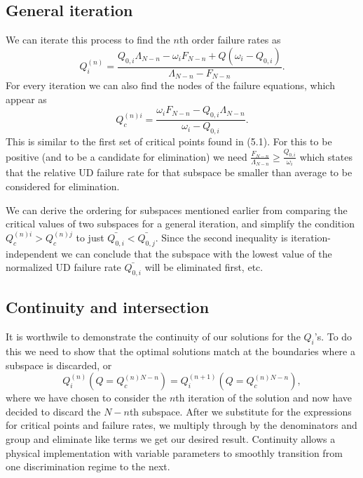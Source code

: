 \documentclass[12pt,oneside,english,reqno]{amsbook}
\numberwithin{section}{chapter}
\numberwithin{equation}{section}
\numberwithin{figure}{section}
\begin{document}
\subsection{General iteration}
We can iterate this process to find the $n$th order failure rates as
\begin{equation}  Q^{(n)}_i = \frac{ Q_{0,i}\Lambda_{N-n}  -  \omega_{i} F_{N-n} + Q( \omega_i - Q_{0,i} ) }{\Lambda_{N-n} - F_{N-n}}.\end{equation}
For every iteration we can also find the nodes of the failure equations, which appear as
\begin{equation}Q^{(n)i}_c = \frac{ \omega_{i} F_{N-n} -  Q_{0,i}\Lambda_{N-n}}{\omega_i - Q_{0,i}}.\end{equation}
This is similar to the first set of critical points found in (5.1). For this to be positive (and to be a candidate for elimination) we need $\frac{ F_{N-n}}{\Lambda_{N-n}} \geq\frac{ Q_{0,i}}{\omega_i}$ which states that the relative UD failure rate for that subspace be smaller than average to be considered for elimination. 

We can derive the ordering for subspaces mentioned earlier from comparing the critical values of two subspaces for a general iteration, and simplify the condition $Q^{(n)i}_c> Q^{(n)j}_c$ to just $\bar{Q_{0,i}}<\bar{Q_{0,j}}$.  Since the second inequality is iteration-independent we can conclude that the subspace with the lowest value of the normalized UD failure rate $\bar{Q_{0,i}}$ will be eliminated first, etc.



\subsection{Continuity and intersection}

It is worthwile to demonstrate the continuity of our solutions for the $Q_i$'s.  To do this we need to show that the optimal solutions match at the boundaries where a subspace is discarded, or
\begin{equation}Q^{(n)}_i (Q=Q^{(n)N-n}_c) = Q^{(n+1)}_i (Q=Q^{(n)N-n}_c),\end{equation}
where we have chosen to consider the $n$th iteration of the solution and now have decided to discard the $N-n$th subspace.  After we substitute for the expressions for critical points and failure rates, we multiply through by the denominators and group and eliminate like terms we get our desired result.  Continuity allows a physical implementation with variable parameters to smoothly transition from one discrimination regime to the next.
\end{document}
